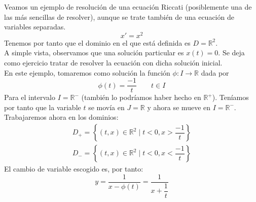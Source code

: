\begin{ejemplo}
    Veamos un ejemplo de resolución de una ecuación Riccati (posiblemente una de las más sencillas de resolver), aunque se trate también de una ecuación de variables separadas.
    \begin{equation*}
        x' = x^2
    \end{equation*}
    Tenemos por tanto que el dominio en el que está definida es $D=\mathbb{R}^2$.\\

    A simple vista, observamos que una solución particular es $x(t) = 0$. Se deja como ejercicio tratar de resolver la ecuación con dicha solución inicial.\\

    En este ejemplo, tomaremos como solución la función $\phi:I\rightarrow\mathbb{R}$ dada por
    \begin{equation*}
        \phi(t) = \dfrac{-1}{t} \qquad t\in I
    \end{equation*}
    Para el intervalo $I = \mathbb{R}^-$ (también lo podríamos haber hecho en $\mathbb{R}^+$). Teníamos por tanto que la variable $t$ se movía en $J=\mathbb{R}$ y ahora se mueve en $I=\mathbb{R}^-$.\\

    Trabajaremos ahora en los dominios:
    \begin{gather*}
        D_+ = \left\{(t,x)\in \mathbb{R}^2 \mid t<0, x>\dfrac{-1}{t}\right\} \\
        D_- = \left\{(t,x)\in \mathbb{R}^2 \mid t<0, x<\dfrac{-1}{t}\right\} 
    \end{gather*}
    El cambio de variable escogido es, por tanto:
    \begin{equation*}
        y = \dfrac{1}{x-\phi(t)} = \dfrac{1}{x+\dfrac{1}{t}}
    \end{equation*}


\end{ejemplo}
